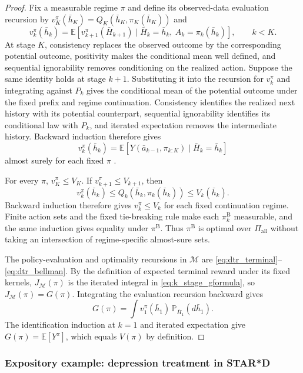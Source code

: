 \begin{proof}
Fix a measurable regime $\pi$ and define its observed-data evaluation recursion by $v_K^\pi(\bar h_K)=Q_K(\bar h_K,\pi_K(\bar h_K))$ and
\[
v_k^\pi(\bar h_k)
=\mathbb E\!\left[
v_{k+1}^\pi(\bar H_{k+1})
\mid \bar H_k=\bar h_k,\ A_k=\pi_k(\bar h_k)
\right],
\qquad k<K.
\]
At stage $K$, consistency replaces the observed outcome by the corresponding potential outcome, positivity makes the conditional mean well defined, and sequential ignorability removes conditioning on the realized action. Suppose the same identity holds at stage $k+1$. Substituting it into the recursion for $v_k^\pi$ and integrating against $P_k$ gives the conditional mean of the potential outcome under the fixed prefix and regime continuation. Consistency identifies the realized next history with its potential counterpart, sequential ignorability identifies its conditional law with $P_k$, and iterated expectation removes the intermediate history. Backward induction therefore gives
\[
v_k^\pi(\bar h_k)
=\mathbb E\!\left[
Y(\bar a_{k-1},\pi_{k:K})
\mid \bar H_k=\bar h_k
\right]
\]
almost surely for each fixed $\pi$ \citep{murphy2003dtr}.

For every $\pi$, $v_K^\pi\leq V_K$. If $v_{k+1}^\pi\leq V_{k+1}$, then
\[
v_k^\pi(\bar h_k)
\leq Q_k(\bar h_k,\pi_k(\bar h_k))
\leq V_k(\bar h_k).
\]
Backward induction therefore gives $v_k^\pi\leq V_k$ for each fixed continuation regime. Finite action sets and the fixed tie-breaking rule make each $\pi_k^{\mathrm B}$ measurable, and the same induction gives equality under $\pi^{\mathrm B}$. Thus $\pi^{\mathrm B}$ is optimal over $\Pi_{\mathrm{all}}$ without taking an intersection of regime-specific almost-sure sets.

The policy-evaluation and optimality recursions in $\mathcal M$ are \eqref{eq:dtr_terminal}--\eqref{eq:dtr_bellman}. By the definition of expected terminal reward under its fixed kernels,
$J_{\mathcal M}(\pi)$ is the iterated integral in \eqref{eq:k_stage_gformula}, so $J_{\mathcal M}(\pi)=G(\pi)$. Integrating the evaluation recursion backward gives
\[
G(\pi)=\int v_1^\pi(\bar h_1)\,\mathbb P_{\bar H_1}(d\bar h_1).
\]
The identification induction at $k=1$ and iterated expectation give
$G(\pi)=\mathbb E[Y^\pi]$, which equals $V(\pi)$ by definition.
\end{proof}

\subsubsection*{Expository example: depression treatment in STAR*D}

